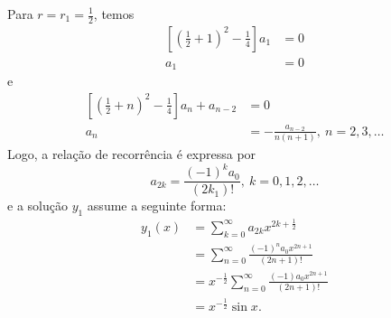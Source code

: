 \documentclass[a4paper,12pt, leqno, answers]{exam}
\begin{document}
\begin{questions}
\begin{solution}
        Para $r = r_1 = \frac{1}{2}$, temos
        \begin{align*}
            \left[ \left( \frac{1}{2} + 1 \right)^2 - \frac{1}{4} \right] a_1 &= 0 \\
            a_1 &= 0
        \end{align*}
        e
        \begin{align*}
            \left[ \left( \frac{1}{2} + n \right)^2 - \frac{1}{4} \right] a_n + a_{n - 2} &=0 \\
            a_n &= - \frac{a_{n - 2}}{n \left( n + 1 \right)}, \ n = 2, 3, \ldots
        \end{align*}
        Logo, a rela\c{c}\~{a}o de recorr\^{e}ncia \'{e} expressa por
        \[
        a_{2k} = \frac{\left( -1 \right)^k a_0}{\left( 2k _ 1 \right)!}, \ k = 0, 1, 2, \ldots
        \]
        e a solu\c{c}\~{a}o $y_1$ assume a seguinte forma:
        \begin{align*}
            y_1\left( x \right) &= \sum_{k = 0}^\infty a_{2k} x^{2k + \frac{1}{2}} \\
            &= \sum_{n = 0}^\infty \frac{\left( -1 \right)^n a_0 x^{2n + 1}}{\left( 2n + 1 \right)!} \\
            &= x^{-\frac{1}{2}} \sum_{n = 0}^\infty \frac{\left( -1 \right) a_0 x^{2n + 1}}{\left( 2 n + 1 \right)!} \\
            &= x^{-\frac{1}{2}} \sin x.
        \end{align*}


\end{solution}
\end{questions}
\end{document}
